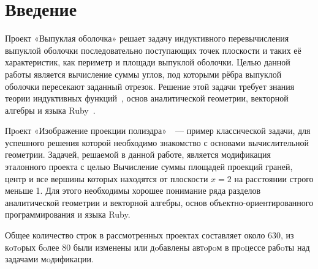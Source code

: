 \section{Введение}

Проект «Выпуклая оболочка»\cite{convex} решает задачу индуктивного 
перевычисления 
выпуклой оболочки последовательно поступающих точек плоскости и таких её
характеристик, как периметр и площади выпуклой оболочки. Целью данной работы является
вычисление суммы углов, под которыми рёбра выпуклой оболочки пересекают заданный отрезок.
Решение этой задачи требует знания теории индуктивных
функций~\cite{roganov-2002}, основ аналитической геометрии, векторной алгебры
и языка Ruby~\cite{ruby}.

Прoект «Изображение проекции полиэдра»~\cite{polyedr}~--- пример
классической задачи, для успешного решения которой необходимо знакомство с
основами вычислительной геометрии. Задачей, решаемой в данной работе, является
модификация эталонного проекта с целью Вычисление суммы площадей проекций граней, центр и все вершины которых находятся от плоскости $\mathit x = 2$ на расстоянии строго меньше 1. 
Для этого необходимы хорошее понимание ряда разделов 
аналитической геометрии и векторной алгебры, основ объектно-ориентированного
программирования и языка Ruby. 

Общее количество строк в рассмотренных проектах составляет около 630, из кoтoрых
бoлее 80 были изменены или дoбавлены автoрoм в прoцессе рабoты
над задачами мoдификации.
